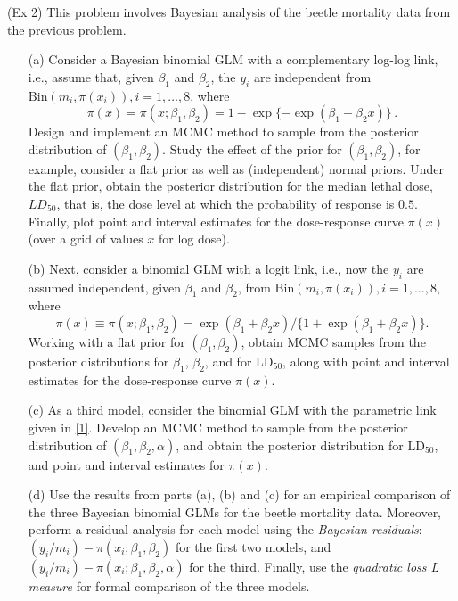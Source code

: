 \documentclass[]{article}
\begin{document}
\begin{enumerate}
{        \item (Ex 2)
        This problem involves Bayesian analysis of the beetle mortality data from the previous problem.
        \begin{itemize}
        	\item[(a)]Consider a Bayesian binomial GLM with a complementary log-log link, i.e., assume that, given $\beta_1$ and $\beta_2$, the $y_i$ are independent from $\mathrm{Bin}(m_i,\pi(x_i)), i = 1,\ldots,8$, where 
        	$$\pi(x) = \pi(x; \beta_1, \beta_2) = 1 - \exp\{-\exp(\beta_1 + \beta_2 x)\}\,.$$
        	Design and implement an MCMC method to sample from the posterior distribution of $(\beta_1,\beta_2)$. Study the effect of the prior for $(\beta_1,\beta_2)$, for example, consider a flat prior as well as (independent) normal priors. Under the flat prior, obtain the posterior distribution for the median lethal dose, $LD_{50}$, that is, the dose level at which the probability of response is $0.5$. Finally, plot point and interval estimates for the dose-response curve $\pi(x)$ (over a grid of values $x$ for log dose).
        	\item[(b)]Next, consider a binomial GLM with a logit link, i.e., now the $y_i$ are assumed independent, given $\beta_1$ and $\beta_2$, from $\mathrm{Bin}(m_i,\pi(x_i)), i = 1,\ldots,8$, where 
        	$$\pi(x) \equiv \pi(x;\beta_1,\beta_2) = \exp(\beta_1 + \beta_2 x)/\{1+\exp(\beta_1 + \beta_2x)\}.$$
        	Working with a flat prior for $(\beta_1, \beta_2)$, obtain MCMC samples from the posterior distributions for $\beta_1$, $\beta_2$, and for $\mathrm{LD}_{50}$, along with point and interval estimates for the dose-response curve $\pi(x)$.
        	\item[(c)] As a third model, consider the binomial GLM with the parametric link given in \ref{1}. Develop an MCMC method to sample from the posterior distribution of $(\beta_1,\beta_2,\alpha)$, and obtain the posterior distribution for $\mathrm{LD}_{50}$, and point and interval estimates for $\pi(x)$.
        	\item[(d)] Use the results from parts (a), (b) and (c) for an empirical comparison of the three Bayesian binomial GLMs for the beetle mortality data. Moreover, perform a residual analysis for each model using the \textit{Bayesian residuals}: $(y_i/m_i) - \pi(x_i;\beta_1,\beta_2)$ for the first two models, and $(y_i/m_i) - \pi(x_i;\beta_1,\beta_2,\alpha)$ for the third. Finally, use the \textit{quadratic loss L measure} for formal comparison of the three models.
        	

\end{itemize}}
\end{enumerate}
\end{document}

